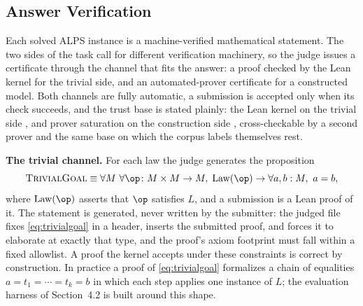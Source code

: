 
\subsection{Answer Verification}

Each solved ALPS instance is a machine-verified mathematical statement. The
two sides of the task call for different verification machinery, so the judge
issues a certificate through the channel that fits the answer: a proof
checked by the Lean kernel for the trivial side, and an automated-prover
certificate for a constructed model. Both channels are fully automatic, a
submission is accepted only when its check succeeds, and the trust base is
stated plainly: the Lean kernel on the trivial side
\citep{moura2021lean}, and prover saturation on the construction side
\citep{kovacs2013first}, cross-checkable by a second prover
\citep{smallbone2021twee} and the same base on which the corpus labels
themselves rest.

\textbf{The trivial channel.} For each law the judge generates the
proposition
\begin{equation}
\label{eq:trivialgoal}
\textsc{TrivialGoal} \equiv \forall M\ \forall {\op}\colon M \times M \to
M,\; \mathrm{Law}(\op) \rightarrow \forall a, b : M,\ a = b,
\end{equation}
where $\mathrm{Law}(\op)$ asserts that $\op$ satisfies $L$, and a submission
is a Lean proof of it. The statement is generated, never written by the
submitter: the judged file fixes \eqref{eq:trivialgoal} in a header, inserts
the submitted proof, and forces it to elaborate at exactly that type, and the
proof's axiom footprint must fall within a fixed allowlist. A proof the
kernel accepts under these constraints is correct by construction. In
practice a proof of \eqref{eq:trivialgoal} formalizes a chain of equalities
$a = t_1 = \cdots = t_k = b$ in which each step applies one instance of $L$;
the evaluation harness of Section~4.2 is built around this shape.


